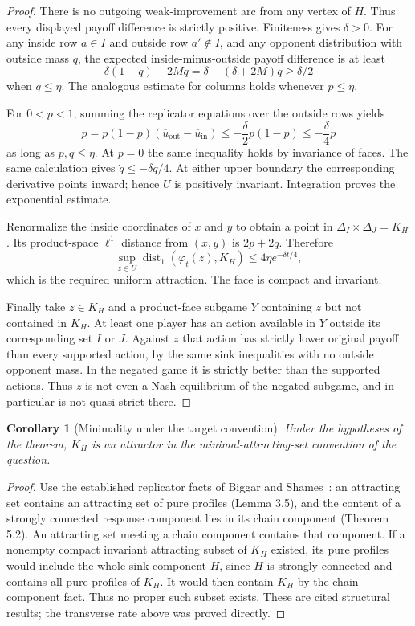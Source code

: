 \documentclass[11pt]{article}
\newtheorem{corollary}{Corollary}
\theoremstyle{definition}
\theoremstyle{remark}
\begin{document}
\begin{proof}
There is no outgoing weak-improvement arc from any vertex of $H$. Thus every displayed payoff difference is strictly positive. Finiteness gives $\delta>0$. For any inside row $a\in I$ and outside row $a'\notin I$, and any opponent distribution with outside mass $q$, the expected inside-minus-outside payoff difference is at least
\[
 \delta(1-q)-2Mq=\delta-(\delta+2M)q\geq\delta/2
\]
when $q\leq\eta$. The analogous estimate for columns holds whenever $p\leq\eta$.

For $0<p<1$, summing the replicator equations over the outside rows yields
\[
 \dot p=p(1-p)(\overline u_{\mathrm{out}}-\overline u_{\mathrm{in}})
 \leq-\frac\delta2 p(1-p)\leq-\frac\delta4p
\]
as long as $p,q\leq\eta$. At $p=0$ the same inequality holds by invariance of faces. The same calculation gives $\dot q\leq-\delta q/4$. At either upper boundary the corresponding derivative points inward; hence $U$ is positively invariant. Integration proves the exponential estimate.

Renormalize the inside coordinates of $x$ and $y$ to obtain a point in $\Delta_I\times\Delta_J=K_H$. Its product-space $\ell^1$ distance from $(x,y)$ is $2p+2q$. Therefore
\[
 \sup_{z\in U}\operatorname{dist}_1(\varphi_t(z),K_H)
 \leq4\eta e^{-\delta t/4},
\]
which is the required uniform attraction. The face is compact and invariant.

Finally take $z\in K_H$ and a product-face subgame $Y$ containing $z$ but not contained in $K_H$. At least one player has an action available in $Y$ outside its corresponding set $I$ or $J$. Against $z$ that action has strictly lower original payoff than every supported action, by the same sink inequalities with no outside opponent mass. In the negated game it is strictly better than the supported actions. Thus $z$ is not even a Nash equilibrium of the negated subgame, and in particular is not quasi-strict there.
\end{proof}

\begin{corollary}[Minimality under the target convention]
Under the hypotheses of the theorem, $K_H$ is an attractor in the minimal-attracting-set convention of the question.
\end{corollary}
\begin{proof}
Use the established replicator facts of Biggar and Shames~\cite{chain}: an attracting set contains an attracting set of pure profiles (Lemma 3.5), and the content of a strongly connected response component lies in its chain component (Theorem 5.2). An attracting set meeting a chain component contains that component. If a nonempty compact invariant attracting subset of $K_H$ existed, its pure profiles would include the whole sink component $H$, since $H$ is strongly connected and contains all pure profiles of $K_H$. It would then contain $K_H$ by the chain-component fact. Thus no proper such subset exists. These are cited structural results; the transverse rate above was proved directly.
\end{proof}
\end{document}
